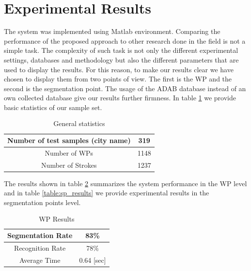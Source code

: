 \documentclass[10pt, conference, compsocconf]{IEEEtran}
\begin{document}

\section{Experimental Results}
\label{sec:results}
The system was implemented using Matlab environment. Comparing the performance of the proposed approach to other research done in the field is not a simple task. The complexity of such task is not only the different experimental settings, databases and methodology but also the different parameters that are used to display the results. For this reason, to make our results clear we have chosen to display them from two points of view. The first is the WP and the second is the segmentation point. The usage of the ADAB database instead of an own collected database give our results further firmness. In table \ref{table:general_stats} we provide basic statistics of our sample set.\\

\begin{table}[h]
\caption{General statistics}
\begin{tabular}{ | c | c | }
  \hline
  Number of test samples (city name) & 319 \\
  \hline
  Number of WPs & 1148 \\
  \hline
  Number of Strokes & 1237 \\
  \hline
\end{tabular}
\centering
\label{table:general_stats} 
\end{table}

The results shown in table \ref{table:wp_results} summarizes the system performance in the WP level and in table \ref{table:sp_results} we provide experimental results in the segmentation points level. 

\begin{table}[h]
\caption{WP Results}
\begin{tabular}{ | c | c | }
  \hline
  Segmentation Rate &  83\% \\ 
 \hline
  Recognition Rate &  78\% \\ 
 \hline
  Average Time & 0.64 [sec] \\
\hline
\end{tabular}
\centering
\label{table:wp_results} 
\end{table}
\end{document}
